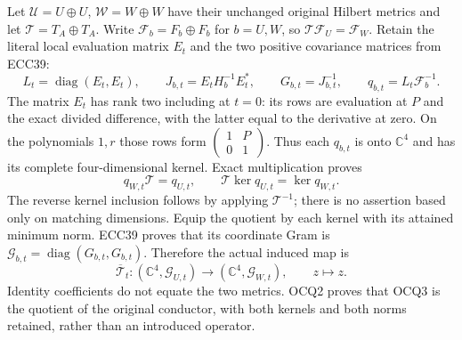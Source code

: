 \documentclass[11pt]{article}
\newcommand{\diag}{\operatorname{diag}}
\begin{document}
Let $\mathcal U=U\oplus U$, $\mathcal W=W\oplus W$ have their unchanged
original Hilbert metrics and let $\mathcal T=T_A\oplus T_A$. Write
$\mathcal F_b=F_b\oplus F_b$ for $b=U,W$, so
$\mathcal T\mathcal F_U=\mathcal F_W$. Retain the literal local
evaluation matrix $E_t$ and the two positive covariance matrices from ECC39:
\[
 L_t=\diag(E_t,E_t),\qquad
 J_{b,t}=E_tH_b^{-1}E_t^*,\qquad G_{b,t}=J_{b,t}^{-1},\qquad
 q_{b,t}=L_t\mathcal F_b^{-1}.
 \tag{OCQ1}
\]
The matrix $E_t$ has rank two including at $t=0$: its rows are evaluation
at $P$ and the exact divided difference, with the latter equal to the
derivative at zero. On the polynomials $1,r$ those rows form
$\left(\begin{smallmatrix}1&P\\0&1\end{smallmatrix}\right)$.
Thus each $q_{b,t}$ is onto $\mathbb C^4$ and has its complete
four-dimensional kernel. Exact multiplication proves
\[
 q_{W,t}\mathcal T=q_{U,t},\qquad
 \mathcal T\ker q_{U,t}=\ker q_{W,t}.
 \tag{OCQ2}
\]
The reverse kernel inclusion follows by applying $\mathcal T^{-1}$;
there is no assertion based only on matching dimensions.
Equip the quotient by each kernel with its attained minimum norm.
ECC39 proves that its coordinate Gram is
$\mathcal G_{b,t}=\diag(G_{b,t},G_{b,t})$. Therefore the actual induced map is
\[
 \overline{\mathcal T}_t:
 (\mathbb C^4,\mathcal G_{U,t})\longrightarrow
 (\mathbb C^4,\mathcal G_{W,t}),\qquad z\longmapsto z.
 \tag{OCQ3}
\]
Identity coefficients do not equate the two metrics. OCQ2 proves
that OCQ3 is the quotient of the original conductor, with both kernels
and both norms retained, rather than an introduced operator.
\end{document}
